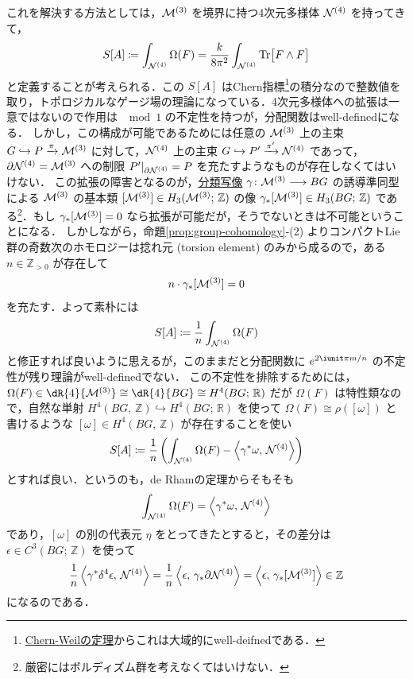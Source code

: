 \documentclass[TQFT_main]{subfiles}
\begin{document}
これを解決する方法としては，$\mathcal{M}^{(3)}$ を境界に持つ4次元多様体 $\mathcal{N}^{(4)}$ を持ってきて，
\begin{align}
    S[A] \coloneqq \int_{\mathcal{N}^{(4)}} \Omega(F) = \frac{k}{8\pi^2} \int_{\mathcal{N}^{(4)}} \Tr \bigl[ F \wedge F \bigr] 
\end{align}
と定義することが考えられる．この $S[A]$ はChern指標\footnote{\hyperref[thm:Chern-Weil]{Chern-Weilの定理}からこれは大域的にwell-deifnedである．}の積分なので整数値を取り，トポロジカルなゲージ場の理論になっている．4次元多様体への拡張は一意ではないので作用は $\mod 1$ の不定性を持つが，分配関数はwell-definedになる．
しかし，この構成が可能であるためには任意の $\mathcal{M}^{(3)}$ 上の主束 $G \hookrightarrow P \xrightarrow{\pi} \mathcal{M}^{(3)}$ に対して，$\mathcal{N}^{(4)}$ 上の主束 $G \hookrightarrow P' \xrightarrow{\pi'} \mathcal{N}^{(4)}$ であって，$\partial \mathcal{N}^{(4)} = \mathcal{M}^{(3)}$ への制限 $P'|_{\partial \mathcal{N}^{(4)}} = P$ を充たすようなものが存在しなくてはいけない．
この拡張の障害となるのが，\hyperref[prop:universal-basic]{分類写像} $\gamma \colon \mathcal{M}^{(3)} \longrightarrow BG$ の誘導準同型による $\mathcal{M}^{(3)}$ の基本類 $[\mathcal{M}^{(3)}] \in H_3(\mathcal{M}^{(3)};\, \mathbb{Z})$ の像 $\gamma_* [\mathcal{M}^{(3)}] \in H_3(BG;\, \mathbb{Z})$ である\footnote{厳密にはボルディズム群を考えなくてはいけない．}．もし $\gamma_* [\mathcal{M}^{(3)}] = 0$ なら拡張が可能だが，そうでないときは不可能ということになる．
しかしながら，命題\ref{prop:group-cohomology}-(2) よりコンパクトLie群の奇数次のホモロジーは捻れ元 (torsion element) のみから成るので，ある $n \in \mathbb{Z}_{> 0}$ が存在して
\begin{align}
    n \cdot \gamma_* [\mathcal{M}^{(3)}] = 0
\end{align}
を充たす．よって素朴には
\begin{align}
    S[A] \coloneqq \frac{1}{n} \int_{\mathcal{N}^{(4)}} \Omega(F)
\end{align}
と修正すれば良いように思えるが，このままだと分配関数に $e^{2\iunit \pi m/n}$ の不定性が残り理論がwell-definedでない．
この不定性を排除するためには，$\Omega(F) \in \dR{4}{\mfdcal{M}{3}} \cong \dR{4}{BG} \cong H^4(BG;\, \mathbb{R})$ だが $\Omega(F)$ は特性類なので，自然な単射 $H^4(BG,\, \mathbb{Z}) \hookrightarrow H^4(BG;\, \mathbb{R})$ を使って $\Omega(F) \cong \rho ([\omega])$ と書けるような $[\omega] \in H^4(BG,\, \mathbb{Z})$ が存在することを使い
\begin{align}
    S[A] \coloneqq \frac{1}{n} \left(\int_{\mathcal{N}^{(4)}} \Omega(F) - \expval{\gamma^* \omega,\, \mathcal{N}^{(4)}} \right)
\end{align}
とすれば良い．というのも，de Rhamの定理からそもそも
\begin{align}
    \int_{\mathcal{N}^{(4)}} \Omega(F) = \expval{\gamma^* \omega,\, \mathcal{N}^{(4)}}
\end{align}
であり，$[\omega]$ の別の代表元 $\eta$ をとってきたとすると，その差分は $\epsilon \in C^3(BG;\, \mathbb{Z})$ を使って
\begin{align}
    \frac{1}{n} \expval{\gamma^* \delta^4 \epsilon,\, \mathcal{N}^{(4)}} = \frac{1}{n} \expval{\epsilon,\, \gamma_* \partial \mathcal{N}^{(4)}} = \expval{\epsilon,\, \gamma_* [\mathcal{M}^{(3)}]} \in \mathbb{Z}
\end{align}
になるのである．
\end{document}
